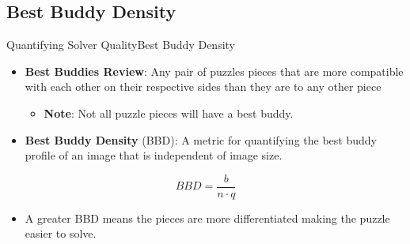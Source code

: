 \documentclass[10pt]{beamer}
\begin{document}
\subsection{Best Buddy Density}
\begin{frame}{Quantifying Solver Quality}{Best Buddy Density}
  \begin{itemize}
    \setlength\itemsep{1em}
    \item \textbf{Best Buddies Review}: Any pair of puzzles pieces that are more compatible with each other on their respective sides than they are to any other piece
    \begin{itemize}
      \item \textbf{Note}: Not all puzzle pieces will have a best buddy.
    \end{itemize}
    \vfill
    \item \textbf{Best Buddy Density} (BBD): A metric for quantifying the best buddy profile of an image that is independent of image size.
  \end{itemize}
  \vfill
  \begin{equation} \label{eq:bestBuddyDensity}
    BBD = \frac{b}{n \cdot q}
  \end{equation}
  \vspace{-0.6em}
  \begin{itemize}
    \vfill
    \item A greater BBD means the pieces are more differentiated making the puzzle easier to solve.
  \end{itemize}
\end{frame}
\end{document}
